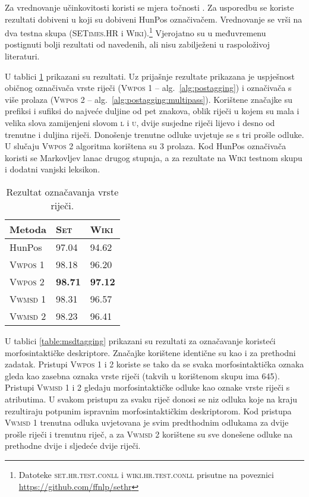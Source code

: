 Za vrednovanje učinkovitosti koristi se mjera točnosti . Za
usporedbu se koriste rezultati dobiveni u \citep{agic2013lemmatization} koji su
dobiveni HunPos označivačem. Vrednovanje se vrši na dva testna skupa
(\textsc{SETimes.HR} i \textsc{Wiki}).\footnote{Datoteke
\textsc{set.hr.test.conll} i \textsc{wiki.hr.test.conll} prisutne na poveznici
\url{https://github.com/ffnlp/sethr}} Vjerojatno su u međuvremenu postignuti
bolji rezultati od navedenih, ali nisu zabilježeni u raspoloživoj literaturi.

U tablici \ref{table:postagging} prikazani su rezultati. Uz prijašnje rezultate
prikazana je uspješnost običnog označivača vrste riječi (\textsc{Vwpos 1} --
alg.~\ref{alg:postagging}) i označivača s više prolaza (\textsc{Vwpos 2} --
alg.~\ref{alg:postagging:multipass}). Korištene značajke su prefiksi i sufiksi
do najveće duljine od pet znakova, oblik riječi u kojem su mala i velika slova
zamijenjeni slovom \textsc{l} i \textsc{u}, dvije susjedne riječi lijevo i desno
od trenutne i duljina riječi. Donošenje trenutne odluke uvjetuje se s tri prošle
odluke. U slučaju \textsc{Vwpos 2} algoritma korištena su 3 prolaza. Kod HunPos
označivača koristi se Markovljev lanac drugog stupnja, a za rezultate na
\textsc{Wiki} testnom skupu i dodatni vanjski leksikon.

\begin{table}[]
\centering
\caption[Rezultat označavanja vrste riječi.]{Rezultat označavanja vrste riječi.}
\label{table:postagging}
\begin{tabular}{|l|l|l|}
\hline
Metoda             & \textsc{Set}   & \textsc{Wiki}  \\ \hline \hline
HunPos             & 97.04          & 94.62          \\
\textsc{Vwpos 1}   & 98.18          & 96.20          \\
\textsc{Vwpos 2}   & \textbf{98.71} & \textbf{97.12} \\
\textsc{Vwmsd} 1   & 98.31          & 96.57          \\
\textsc{Vwmsd} 2   & 98.23          & 96.41          \\ \hline
\end{tabular}
\end{table}

U tablici \ref{table:msdtagging} prikazani su rezultati za označavanje koristeći
morfosintaktičke deskriptore. Značajke korištene identične su kao i za prethodni
zadatak. Pristupi \textsc{Vwpos 1} i \textsc{2} koriste se tako da se svaka
morfosintaktička oznaka gleda kao zasebna oznaka vrste riječi (takvih u
korištenom skupu ima 645). Pristupi \textsc{Vwmsd} 1 i 2 gledaju
morfosintaktičke odluke kao oznake vrste riječi s atributima. U svakom pristupu
za svaku riječ donosi se niz odluka koje na kraju rezultiraju potpunim ispravnim
morfosintaktičkim deskriptorom.  Kod pristupa \textsc{Vwmsd 1} trenutna odluka
uvjetovana je svim predthodnim odlukama za dvije prošle riječi i trenutnu riječ,
a za \textsc{Vwmsd 2} korištene su sve donešene odluke na prethodne dvije i
sljedeće dvije riječi.

